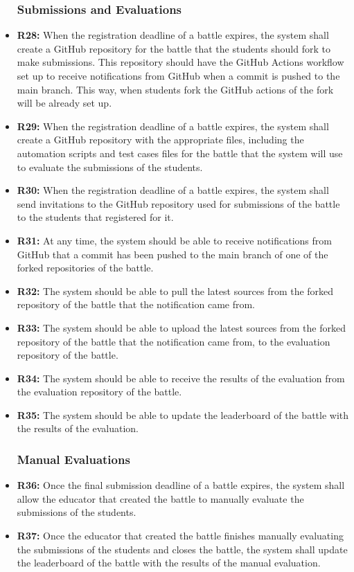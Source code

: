 \documentclass{article}
\begin{document}
\begin{itemize}
    \subsubsection*{Submissions and Evaluations}

    \item \textbf{R28:} When the registration deadline of a battle expires, the system shall create a GitHub repository for the battle that the students should fork to make submissions. This repository should have the GitHub Actions workflow set up to receive notifications from GitHub when a commit is pushed to the main branch. This way, when students fork the GitHub actions of the fork will be already set up.
    \item \textbf{R29:} When the registration deadline of a battle expires, the system shall create a GitHub repository with the appropriate files, including the automation scripts and test cases files for the battle that the system will use to evaluate the submissions of the students.
    \item \textbf{R30:} When the registration deadline of a battle expires, the system shall send invitations to the GitHub repository used for submissions of the battle to the students that registered for it.
    \item \textbf{R31:} At any time, the system should be able to receive notifications from GitHub that a commit has been pushed to the main branch of one of the forked repositories of the battle.
    \item \textbf{R32:} The system should be able to pull the latest sources from the forked repository of the battle that the notification came from.
    \item \textbf{R33:} The system should be able to upload the latest sources from the forked repository of the battle that the notification came from, to the evaluation repository of the battle.
    \item \textbf{R34:} The system should be able to receive the results of the evaluation from the evaluation repository of the battle.
    \item \textbf{R35:} The system should be able to update the leaderboard of the battle with the results of the evaluation.
    
    \subsubsection*{Manual Evaluations}

    \item \textbf{R36:} Once the final submission deadline of a battle expires, the system shall allow the educator that created the battle to manually evaluate the submissions of the students.
    \item \textbf{R37:} Once the educator that created the battle finishes manually evaluating the submissions of the students and closes the battle, the system shall update the leaderboard of the battle with the results of the manual evaluation.
    

\end{itemize}
\end{document}
